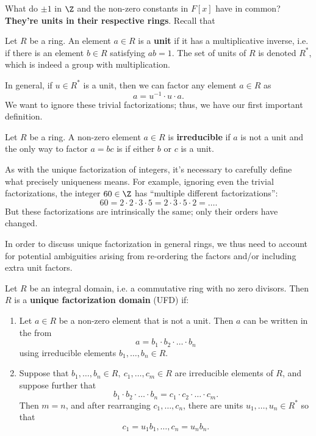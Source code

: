 \documentclass[math1530-lecture-notes]{subfiles}
\begin{document}
What do $\pm 1$ in $\Z$ and the non-zero constants in $F[x]$ have in common? \textbf{They're units
in their respective rings}. Recall that 
\begin{definition}[Units]{}
  Let $R$ be a ring. An element $a\in R$ is a \textbf{unit} if it has a multiplicative inverse, i.e.
  if there is an element $b\in R$ satisfying $ab=1$. The set of units of $R$ is denoted $R^*$, which
  is indeed a group with multiplication.
\end{definition}
In general, if $u\in R^*$ is a unit, then we can factor any element $a\in R$ as \[
  a =u^{-1}\cdot u\cdot a
.\] We want to ignore these trivial factorizations; thus, we have our first important definition.
\begin{definition}[Irreducible]{}
  Let $R$ be a ring. A non-zero element $a\in R$ is \textbf{irreducible} if $a$ is not a unit and
  the only way to factor $a=bc$ is if either $b$ or $c$ is a unit.
\end{definition}
As with the unique factorization of integers, it's necessary to carefully define what precisely
uniqueness means. For example, ignoring even the trivial factorizations, the integer $60\in \Z$ has
``multiple different factorizations'': \[
  60=2\cdot 2\cdot 3\cdot 5=2\cdot 3\cdot 5\cdot 2=\ldots
.\] But these factorizations are intrinsically the same; only their orders have changed.

In order to discuss unique factorization in general rings, we thus need to account for potential
ambiguities arising from re-ordering the factors and/or including extra unit factors.
\begin{definition}{}
  Let $R$ be an integral domain, i.e. a commutative ring with no zero divisors. Then $R$ is a
  \textbf{unique factorization domain} (UFD) if:
  \begin{enumerate}
    \item Let $a\in R$ be a non-zero element that is not a unit. Then $a$ can be written in the from
      \[
        a=b_1\cdot b_2\cdot \ldots\cdot b_n
      \] using irreducible elements $b_1,\ldots,b_n\in R$.
    \item Suppose that $b_1,\ldots,b_n\in R,\ c_1,\ldots,c_m\in R$ are irreducible elements of $R$,
      and suppose further that \[
        b_1\cdot b_2\cdot \ldots\cdot b_n=c_1\cdot c_2\cdot \ldots\cdot c_m
      .\] Then $m=n$, and after rearranging $c_1,\ldots,c_n$, there are units $u_1,\ldots,u_n\in
      R^*$ so that \[
        c_1=u_1b_1,\ldots,c_n=u_nb_n
      .\] 
  \end{enumerate}
\end{definition}
\end{document}
